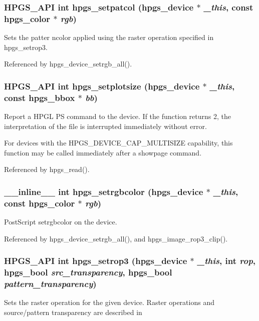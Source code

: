 \subsubsection[{hpgs\_\-setpatcol}]{\setlength{\rightskip}{0pt plus 5cm}HPGS\_\-API int hpgs\_\-setpatcol ({\bf hpgs\_\-device} $\ast$ {\em \_\-this}, \/  const {\bf hpgs\_\-color} $\ast$ {\em rgb})}\label{group__device_ga241c4383528e55adbbb1841d7d8ca2b3}
Sets the patter ncolor applied using the raster operation specified in {\ttfamily hpgs\_\-setrop3}. 

Referenced by hpgs\_\-device\_\-setrgb\_\-all().

\subsubsection[{hpgs\_\-setplotsize}]{\setlength{\rightskip}{0pt plus 5cm}HPGS\_\-API int hpgs\_\-setplotsize ({\bf hpgs\_\-device} $\ast$ {\em \_\-this}, \/  const {\bf hpgs\_\-bbox} $\ast$ {\em bb})}\label{group__device_ga9bab1b2e9a8a18abed30dd3a38f866ed}
Report a HPGL PS command to the device. If the function returns 2, the interpretation of the file is interrupted immediately without error.

For devices with the {\ttfamily HPGS\_\-DEVICE\_\-CAP\_\-MULTISIZE} capability, this function may be called immediately after a showpage command. 

Referenced by hpgs\_\-read().

\subsubsection[{hpgs\_\-setrgbcolor}]{\setlength{\rightskip}{0pt plus 5cm}\_\-\_\-inline\_\-\_\- int hpgs\_\-setrgbcolor ({\bf hpgs\_\-device} $\ast$ {\em \_\-this}, \/  const {\bf hpgs\_\-color} $\ast$ {\em rgb})\hspace{0.3cm}{\ttfamily  [static]}}\label{group__device_gad361763e4803ae55fff0432176dac3ef}
PostScript setrgbcolor on the device. 

Referenced by hpgs\_\-device\_\-setrgb\_\-all(), and hpgs\_\-image\_\-rop3\_\-clip().

\subsubsection[{hpgs\_\-setrop3}]{\setlength{\rightskip}{0pt plus 5cm}HPGS\_\-API int hpgs\_\-setrop3 ({\bf hpgs\_\-device} $\ast$ {\em \_\-this}, \/  int {\em rop}, \/  hpgs\_\-bool {\em src\_\-transparency}, \/  hpgs\_\-bool {\em pattern\_\-transparency})}\label{group__device_ga81809156b70a1a85832f5af7d0f7e5b9}
Sets the raster operation for the given device. Raster operations and source/pattern transparency are described in

